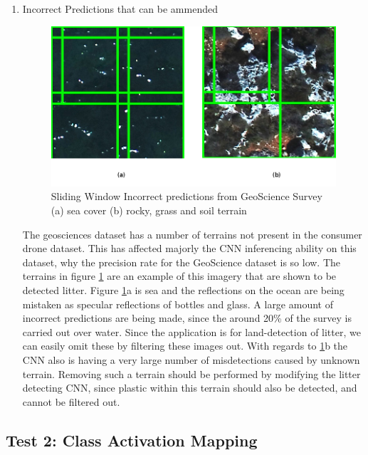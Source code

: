 \documentclass{IEEEtran}
\begin{document}
\begin{enumerate}
\item Incorrect Predictions that can be ammended
\begin{figure}[H]
\centering

\includegraphics[scale=0.4]{images/test1-correctable2.png}
\caption{Sliding Window Incorrect predictions from GeoScience Survey (a) sea cover (b) rocky, grass and soil terrain}
\label{fig:correctable2}
\end{figure}

The geosciences dataset has a number of terrains not present in the consumer drone dataset. This has affected majorly the CNN inferencing ability on this dataset, why the precision rate for the GeoScience dataset is so low. The terrains in figure \ref{fig:correctable2} are an example of this imagery that are shown to be detected litter. Figure \ref{fig:correctable2}a is sea and the reflections on the ocean are being mistaken as specular reflections of bottles and glass. A large amount of incorrect predictions are being made, since the around 20\% of the survey is carried out over water. Since the application is for land-detection of litter, we can easily omit these by filtering these images out. With regards to \ref{fig:correctable2}b the CNN also is having a very large number of misdetections caused by unknown terrain. Removing such a terrain should be performed by modifying the litter detecting CNN, since plastic within this terrain should also be detected, and cannot be filtered out.

\end{enumerate}



\subsection{Test 2: Class Activation Mapping}
\end{document}
